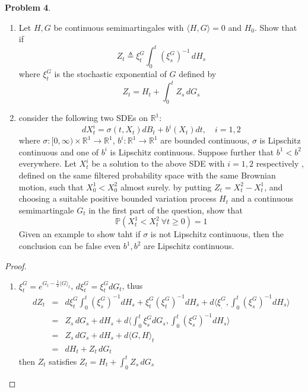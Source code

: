 \documentclass{article}     %
\begin{document}
\noindent
\textbf{Problem 4}. 
  \begin{enumerate}[(1)]
    \item Let $H,G$ be continuous semimartingales with $\langle H,G \rangle = 0$ and $H_0$. Show that if 
    \[Z_t \triangleq \xi_t^G \int_0^t (\xi_s^G)^{-1}\,dH_s\]
    where $\xi_t^G $ is the stochastic exponential of $G$ defined by
    \[Z_t = H_t + \int_0^t Z_s \,dG_s\] 
    \item consider the following two SDEs on $\mathbb{R}^1$:
    \[dX_t^i = \sigma(t,X_t)dB_t + b^i(X_t)dt,\quad i = 1,2\]
    where $\sigma : [0,\infty)\times \mathbb{R}^1\rightarrow \mathbb{R}^1$, $b^i : \mathbb{R}^1 \rightarrow \mathbb{R}^1$ are bounded continuous, $\sigma$ is Lipschitz continuous and one of $b^i$ is Lipschitz continuous. Suppose further that $b^1 < b^2$ everywhere. Let $X_t^i$ be a solution to the above SDE with $i=1,2$ respectively , defined on the same filtered probability space with the same Brownian motion, such that $X_0^1 < X_0^2$ almost surely. by putting $Z_t = X_t^2-X_t^1$, and choosing a suitable positive bounded variation process $H_t$ and a continuous semimartingale $G_t$ in the first part of the question, show that
     \[ \mathbb{P}(X_t^1 < X_t^2~\forall t\geq 0) = 1\]
     Given an example to show taht if $\sigma$ is not Lipschitz continuous, then the conclusion can be false even $b^1,b^2$ are Lipschitz continuous.
\end{enumerate}
\begin{proof}
\begin{enumerate}
    \item $\xi_t^G = e^{G_t - \frac{1}{2} \langle G \rangle_t}$, $d\xi_t^G = \xi_t^G dG_t $, thus \begin{eqnarray*}
        dZ_t & = & d\xi_t^G\int_0^t (\xi_s^G)^{-1}dH_s + \xi_t^G(\xi_t^G)^{-1}dH_s + d\langle \xi_.^G, \int_0^t (\xi_s^G)^{-1}dH_s \rangle \\
        & = & Z_s\,dG_s + dH_s + d\langle \int_0^t \xi_s^G dG_s, \int_0^t (\xi_s^G)^{-1}dH_s \rangle \\
        & = & Z_s\,dG_s + dH_s + d\langle G,H \rangle_t\\
        & = & dH_t + Z_t\,dG_t   
        \end{eqnarray*}
        then $Z_t$ satisfies $Z_t = H_t + \int_0^t Z_s \,dG_s$
        
\end{enumerate}
\end{proof}
\end{document}
